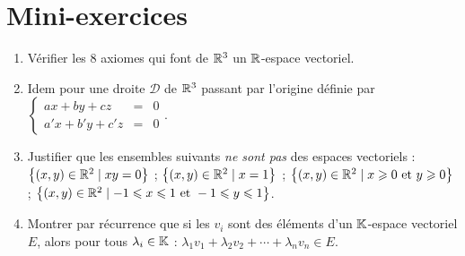 \section{Mini-exercices}

\begin{frame}

\begin{miniexercice}
\begin{enumerate}
  \item Vérifier les $8$ axiomes qui font de $\mathbb{R}^3$ un $\mathbb{R}$-espace vectoriel.

  \item Idem pour une droite $\mathcal{D}$ de $\mathbb{R}^3$ passant par l'origine définie par 
  $\left\{\begin{array}{rcl}ax+by+cz & = & 0 \\a'x+b'y+c'z & = & 0   \end{array}\right.$.
  
  \item Justifier que les ensembles suivants \emph{ne sont pas} des espaces vectoriels :
  $\big\{ (x,y) \in \mathbb{R}^2 \mid xy=0\big\}$ ;
  $\big\{ (x,y) \in \mathbb{R}^2 \mid x=1\big\}$ ;
  $\big\{ (x,y) \in \mathbb{R}^2 \mid x\geqslant0 \text{ et } y\geqslant0 \big\}$ ;  
  $\big\{ (x,y) \in \mathbb{R}^2 \mid -1 \leqslant x \leqslant 1 \text{ et } -1 \leqslant y \leqslant 1 \big\}$.
  
  \item Montrer par récurrence que si les $v_i$ sont des éléments d'un $\mathbb{K}$-espace vectoriel
  $E$, alors pour tous $\lambda_i\in \mathbb{K}$ : $\lambda_1 v_1+\lambda_2v_2+\cdots + \lambda_n v_n \in E$.
\end{enumerate} 
\end{miniexercice}

\end{frame}

